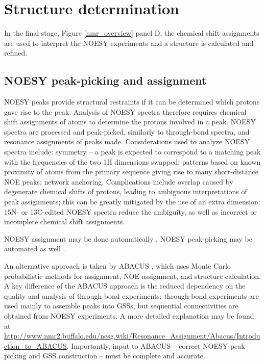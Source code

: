 \section{Structure determination}

In the final stage, Figure \ref{nmr_overview} panel D, the chemical shift 
assignments are used to interpret the NOESY experiments and a structure
is calculated and refined.

\subsection{NOESY peak-picking and assignment}
NOESY peaks provide structural restraints if it can be 
determined which protons gave rise to the peak.  Analysis of NOESY spectra 
therefore requires chemical shift assignments of atoms to 
determine the protons involved in a peak.  
NOESY spectra are  processed and peak-picked, similarly to through-bond 
spectra, and resonance assignments of peaks made.  
Considerations used to analyze 
NOESY spectra include: symmetry -- a peak is expected to correspond to a 
matching peak with the frequencies of the two 1H dimensions swapped; patterns 
based on known proximity of atoms from the primary sequence giving rise to 
many short-distance NOE peaks; network anchoring.  Complications include 
overlap caused by degenerate chemical shifts of protons, leading to 
ambiguous interpretations of peak assignments; this can be greatly mitigated 
by the use of an extra dimension:  15N- or 13C-edited NOESY spectra reduce 
the ambiguity, as well as incorrect or incomplete chemical shift assignments.

NOESY assignment may be done automatically \cite{cyana2004, aria2003}.  
NOESY peak-picking may be automated as well \cite{munin, korzhnev2001munin}.

An alternative approach is taken by ABACUS \cite{abacus_assignment}, which uses
Monte Carlo probabilistic methods for assignment, NOE assignment, and structure
calculation.  A key difference of the ABACUS approach is the reduced dependency
on the quality and analysis of through-bond experiments; through-bond experiments
are used mainly to assemble peaks into GSSs, but sequential connectivities are
obtained from NOESY experiments.  A more detailed explanation may be found at 
\url{http://www.nmr2.buffalo.edu/nesg.wiki/Resonance_Assignment/Abacus/Introduction_to_ABACUS}.
Importantly, input to ABACUS -- correct NOESY peak picking and GSS construction
-- must be complete and accurate.

